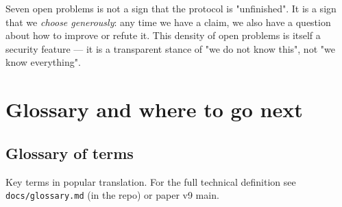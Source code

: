 \documentclass[11pt,a4paper]{article}
\begin{document}
\begin{aha}
Seven open problems is not a sign that the protocol is "unfinished". It is a sign that we \emph{choose generously}: any time we have a claim, we also have a question about how to improve or refute it. This density of open problems is itself a security feature --- it is a transparent stance of "we do not know this", not "we know everything".
\end{aha}

\section{Glossary and where to go next}\label{pop:glossary}

\subsection{Glossary of terms}

Key terms in popular translation. For the full technical definition see \texttt{docs/glossary.md} (in the repo) or paper v9 main.
\end{document}

